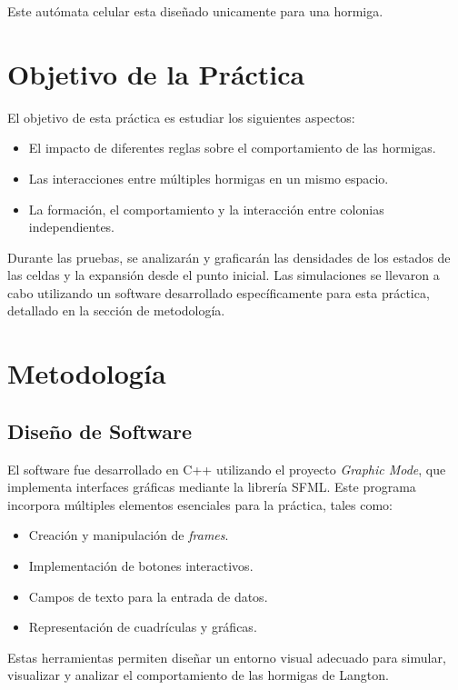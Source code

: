\documentclass[12pt,twoside]{article}
\begin{document}
	Este autómata celular esta diseñado unicamente para una hormiga.
	
\section{Objetivo de la Práctica}

El objetivo de esta práctica es estudiar los siguientes aspectos:  
\begin{itemize}
	\item El impacto de diferentes reglas sobre el comportamiento de las hormigas.  
	\item Las interacciones entre múltiples hormigas en un mismo espacio.  
	\item La formación, el comportamiento y la interacción entre colonias independientes.  
\end{itemize}

Durante las pruebas, se analizarán y graficarán las densidades de los estados de las celdas y la expansión desde el punto inicial. Las simulaciones se llevaron a cabo utilizando un software desarrollado específicamente para esta práctica, detallado en la sección de metodología.

\clearpage
\section{Metodología}

\subsection{Diseño de Software}

El software fue desarrollado en C++ utilizando el proyecto \textit{Graphic Mode}, que implementa interfaces gráficas mediante la librería SFML. Este programa incorpora múltiples elementos esenciales para la práctica, tales como:  
\begin{itemize}
	\item Creación y manipulación de \textit{frames}.
	\item Implementación de botones interactivos.
	\item Campos de texto para la entrada de datos.
	\item Representación de cuadrículas y gráficas.
\end{itemize}

Estas herramientas permiten diseñar un entorno visual adecuado para simular, visualizar y analizar el comportamiento de las hormigas de Langton.
\end{document}
